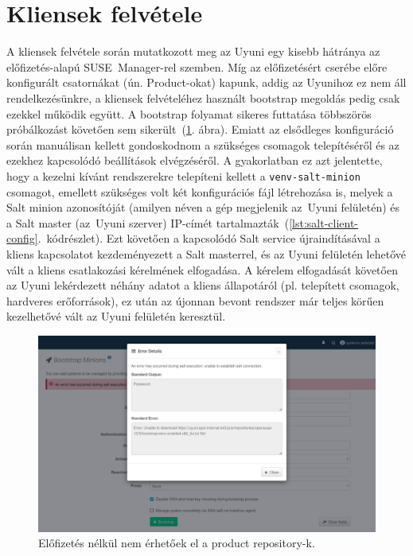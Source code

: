 \section{Kliensek felvétele}
A kliensek felvétele során mutatkozott meg az Uyuni egy kisebb hátránya az előfizetés-alapú SUSE~Manager-rel szemben. Míg az előfizetésért cserébe előre konfigurált csatornákat (ún. Product-okat) kapunk, addig az Uyunihoz ez nem áll rendelkezésünkre, a kliensek felvételéhez használt bootstrap megoldás pedig csak ezekkel működik együtt. A bootstrap folyamat sikeres futtatása többszörös próbálkozást követően sem sikerült~(\ref{fig:uyuni-bootstrap-error}. ábra). Emiatt az elsődleges konfiguráció során manuálisan kellett gondoskodnom a szükséges csomagok telepítéséről és az ezekhez kapcsolódó beállítások elvégzéséről. A gyakorlatban ez azt jelentette, hogy a kezelni kívánt rendszerekre telepíteni kellett a \texttt{venv-salt-minion} csomagot, emellett szükséges volt két konfigurációs fájl létrehozása is, melyek a Salt minion azonosítóját (amilyen néven a gép megjelenik az~Uyuni felületén) és a Salt master (az~Uyuni szerver) IP-címét tartalmazták~(\ref{lst:salt-client-config}.~kódrészlet).
Ezt követően a kapcsolódó Salt service újraindításával a kliens kapcsolatot kezdeményezett a Salt masterrel, és az Uyuni felületén lehetővé vált a kliens csatlakozási kérelmének elfogadása. A kérelem elfogadását követően az Uyuni lekérdezett néhány adatot a kliens állapotáról (pl. telepített csomagok, hardveres erőforrások), ez után az újonnan bevont rendszer már teljes körűen kezelhetővé vált az Uyuni felületén keresztül.

\begin{figure}[ht]
	\centering
	\includegraphics[width=15cm]{figures/uyuni-bootstrap-error.png}
	\caption{Előfizetés nélkül nem érhetőek el a product repository-k.}
	\label{fig:uyuni-bootstrap-error}
\end{figure}



